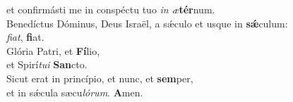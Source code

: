 \oddverse et confirmásti me in conspéctu tuo \textit{in} \textit{æ}\textbf{tér}num.\\
\evenverse Benedíctus Dóminus, Deus Israël, a sǽculo et usque in \textbf{sǽ}culum:~\*\\
\evenverse \textit{fi}\textit{at}, \textbf{fi}at.\\
\oddverse Glória Patri, et \textbf{Fí}lio,~\*\\
\oddverse et Spirí\textit{tu}\textit{i} \textbf{San}cto.\\
\evenverse Sicut erat in princípio, et nunc, et \textbf{sem}per,~\*\\
\evenverse et in sǽcula sæcu\textit{ló}\textit{rum}. \textbf{A}men.\\
